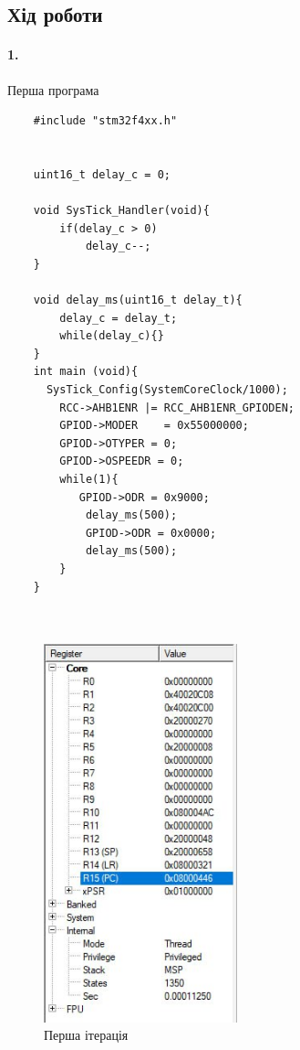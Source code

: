\documentclass[12pt]{extarticle}
\begin{document}
\subsection*{Хід роботи}
\paragraph{1.}Перша програма

\begin{verbatim}
    #include "stm32f4xx.h"


    uint16_t delay_c = 0; 
    
    void SysTick_Handler(void){
        if(delay_c > 0)
            delay_c--;
    }
    
    void delay_ms(uint16_t delay_t){
        delay_c = delay_t;
        while(delay_c){}
    }
    int main (void){
      SysTick_Config(SystemCoreClock/1000);
        RCC->AHB1ENR |= RCC_AHB1ENR_GPIODEN;
        GPIOD->MODER	= 0x55000000;
        GPIOD->OTYPER = 0;
        GPIOD->OSPEEDR = 0;	
        while(1){
           GPIOD->ODR = 0x9000;
            delay_ms(500);
            GPIOD->ODR = 0x0000;	
            delay_ms(500);
        }
    }
    
    
\end{verbatim}

\vspace{12pt}
\begin{figure}[H]
    \centering
    \includegraphics[width=0.50\textwidth]{reg1.jpg}
    \caption{Перша ітерація}
\end{figure}
\end{document}
